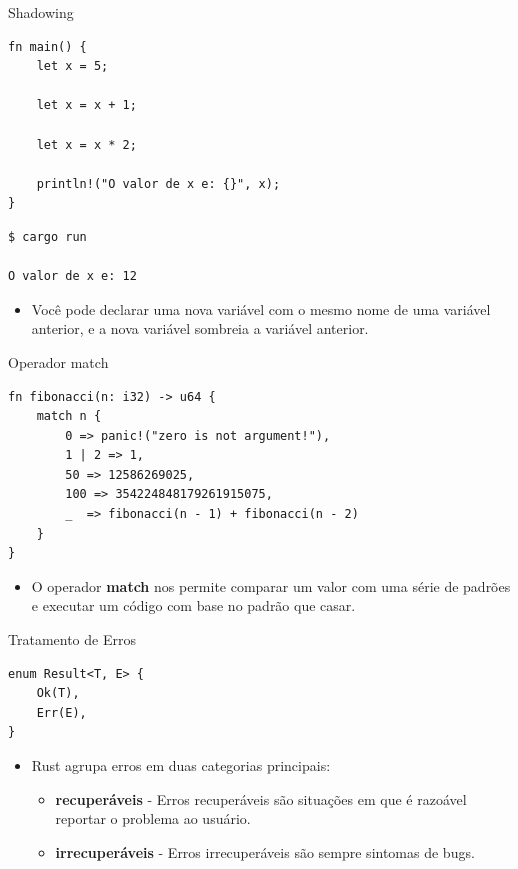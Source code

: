 \begin{frame}[fragile]{Shadowing}
\lstset{language=Rust, style=boxed}
\begin{lstlisting}
fn main() {
    let x = 5;
    
    let x = x + 1;
    
    let x = x * 2;

    println!("O valor de x e: {}", x);
}
\end{lstlisting}

\begin{lstlisting}
$ cargo run

O valor de x e: 12
\end{lstlisting}
\begin{itemize}
    \item Você pode declarar uma nova variável com o mesmo nome de uma variável anterior, e a nova variável sombreia a variável anterior.
\end{itemize}
\end{frame}

\begin{frame}[fragile]{Operador match}
\lstset{language=Rust, style=boxed}
\begin{lstlisting}
fn fibonacci(n: i32) -> u64 {
    match n {
        0 => panic!("zero is not argument!"),
        1 | 2 => 1,
        50 => 12586269025,
        100 => 354224848179261915075,
        _  => fibonacci(n - 1) + fibonacci(n - 2)
    }
}
\end{lstlisting}
\begin{itemize}
    \item O operador \textbf{match} nos permite comparar um valor com uma série de padrões e executar um código com base no padrão que casar.
\end{itemize}
\end{frame}

\begin{frame}[fragile]{Tratamento de Erros}
\lstset{language=Rust, style=boxed}
\begin{lstlisting}
enum Result<T, E> {
    Ok(T),
    Err(E),
}
\end{lstlisting}

\begin{itemize}
    \item Rust agrupa erros em duas categorias principais:
\begin{itemize}
    \item \textbf{recuperáveis} - Erros recuperáveis são situações em que é razoável reportar o problema ao usuário.
    \item \textbf{irrecuperáveis} - Erros irrecuperáveis são sempre sintomas de bugs.
\end{itemize}
\end{itemize}

\end{frame}

